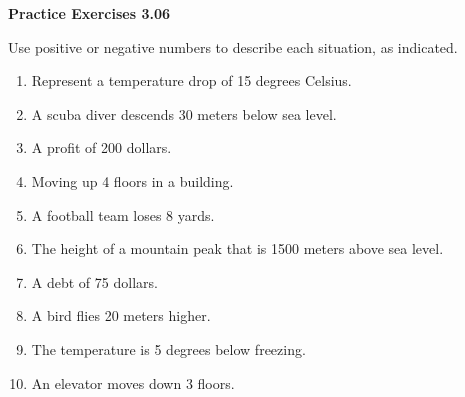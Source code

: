 \vspace{0.3ex}
\noindent\textbf{Practice Exercises 3.06}

\vspace{0.2ex}

Use positive or negative numbers to describe each situation, as indicated.

\begin{enumerate}[label=\color{blue}\arabic*.]
    \item Represent a temperature drop of 15 degrees Celsius.
    \item A scuba diver descends 30 meters below sea level.
    \item A profit of 200 dollars.
    \item Moving up 4 floors in a building.
    \item A football team loses 8 yards.
    \item The height of a mountain peak that is 1500 meters above sea level.
    \item A debt of 75 dollars.
    \item A bird flies 20 meters higher.
    \item The temperature is 5 degrees below freezing.
    \item An elevator moves down 3 floors.
\end{enumerate}
